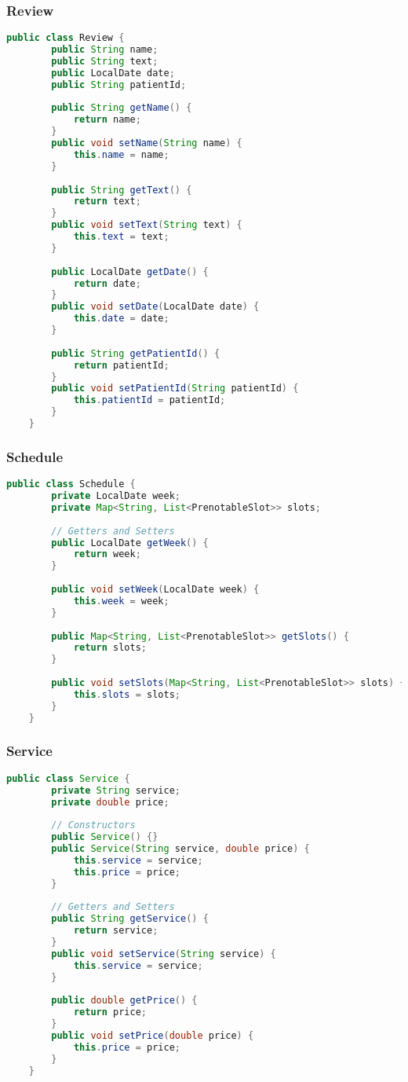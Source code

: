 \subsubsection{Review}
\begin{lstlisting}[language=java]
	public class Review {
		public String name;
		public String text;
		public LocalDate date;
		public String patientId;
		
		public String getName() {
			return name;
		}
		public void setName(String name) {
			this.name = name;
		}
		
		public String getText() {
			return text;
		}
		public void setText(String text) {
			this.text = text;
		}
		
		public LocalDate getDate() {
			return date;
		}
		public void setDate(LocalDate date) {
			this.date = date;
		}
		
		public String getPatientId() {
			return patientId;
		}
		public void setPatientId(String patientId) {
			this.patientId = patientId;
		}
	}
\end{lstlisting}

\subsubsection{Schedule}
\begin{lstlisting}[language=java]
	public class Schedule {
		private LocalDate week;
		private Map<String, List<PrenotableSlot>> slots;
		
		// Getters and Setters
		public LocalDate getWeek() {
			return week;
		}
		
		public void setWeek(LocalDate week) {
			this.week = week;
		}
		
		public Map<String, List<PrenotableSlot>> getSlots() {
			return slots;
		}
		
		public void setSlots(Map<String, List<PrenotableSlot>> slots) {
			this.slots = slots;
		}
	}
\end{lstlisting}

\subsubsection{Service}
\begin{lstlisting}[language=java]
	public class Service {
		private String service;
		private double price;
		
		// Constructors
		public Service() {}
		public Service(String service, double price) {
			this.service = service;
			this.price = price;
		}
		
		// Getters and Setters
		public String getService() {
			return service;
		}
		public void setService(String service) {
			this.service = service;
		}
		
		public double getPrice() {
			return price;
		}
		public void setPrice(double price) {
			this.price = price;
		}
	}
\end{lstlisting}

